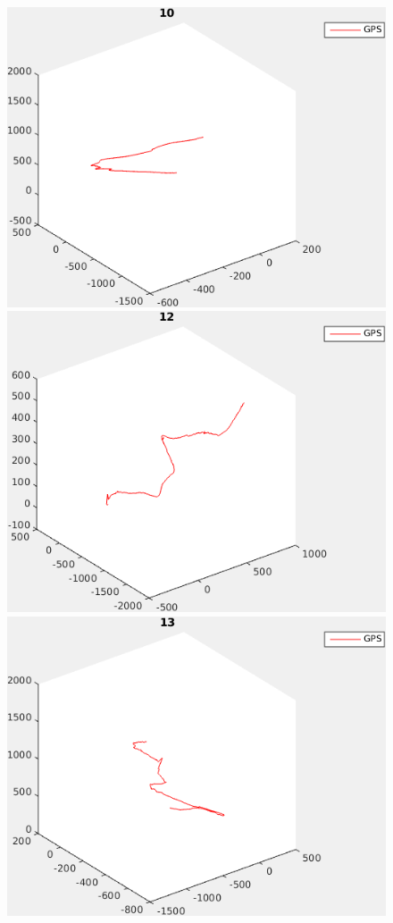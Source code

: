 \documentclass{report}
\begin{document}
\begin{figure}
  \begin{minipage}[b]{.5\textwidth}
    \centering
    \includegraphics[width=.9\textwidth]{10_path}
  \end{minipage}%
  \begin{minipage}[b]{.5\textwidth}
    \centering
    \includegraphics[width=.9\textwidth]{12_path}
  \end{minipage}
  \begin{minipage}[b]{.5\textwidth}
    \centering
    \includegraphics[width=.9\textwidth]{13_path}

\end{minipage}
\end{figure}
\end{document}
